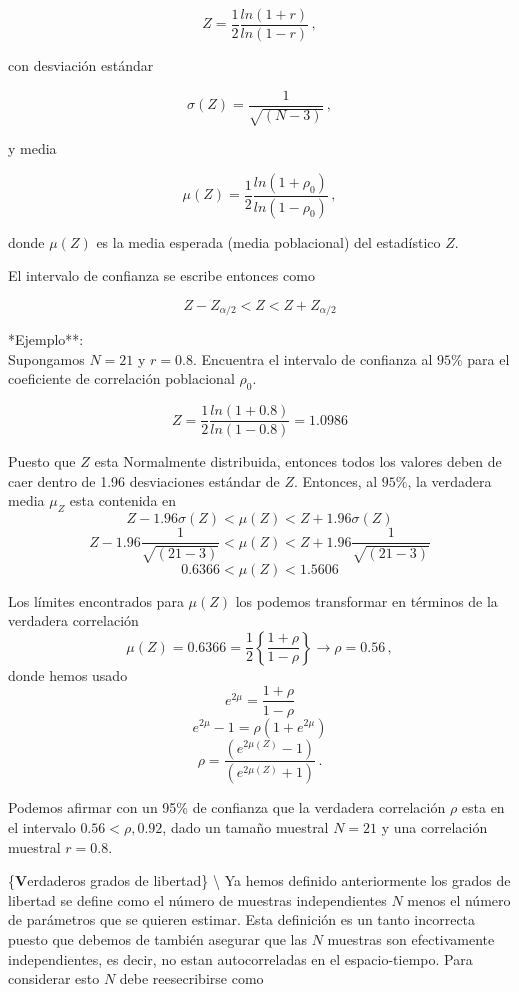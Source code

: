 \documentclass[
]{agujournal2019}
\begin{document}
\[Z=\frac{1}{2}\frac{ln(1+r)}{ln(1-r)}\,,\]

con desviación estándar

\[\sigma(Z)=\frac{1}{\sqrt{(N-3)}}\,,\]

y media

\[\mu(Z)=\frac{1}{2}\frac{ln(1+\rho_0)}{ln(1-\rho_0)}\,,\]

donde \(\mu(Z)\) es la media esperada (media poblacional) del
estadístico \(Z\).

El intervalo de confianza se escribe entonces como

\[Z-Z_{\alpha/2}<Z<Z+Z_{\alpha/2}\]

\vspace{0.5cm}

\noindent **Ejemplo**:\\
\noindent Supongamos \(N=21\) y \(r=0.8\). Encuentra el intervalo de
confianza al \(95\%\) para el coeficiente de correlación poblacional
\(\rho_0\).

\[Z=\frac{1}{2}\frac{ln(1+0.8)}{ln(1-0.8)}=1.0986\]

\noindent Puesto que \(Z\) esta Normalmente distribuida, entonces todos
los valores deben de caer dentro de 1.96 desviaciones estándar de \(Z\).
Entonces, al \(95\%\), la verdadera media \(\mu_Z\) esta contenida en
\[Z-1.96\sigma(Z) < \mu(Z) < Z + 1.96\sigma(Z)\]
\[Z-1.96\frac{1}{\sqrt{(21-3)}} < \mu(Z) < Z + 1.96\frac{1}{\sqrt{(21-3)}}\]
\[0.6366<\mu(Z)<1.5606\]

\noindent Los límites encontrados para \(\mu(Z)\) los podemos
transformar en términos de la verdadera correlación
\[\mu(Z)=0.6366=\frac{1}{2} \left\{ \frac{1+\rho}{1-\rho} \right\} \rightarrow  \rho=0.56\,,\]
donde hemos usado \[e^{2\mu}=\frac{1+\rho}{1-\rho}\]
\[e^{2\mu}-1=\rho(1+e^{2\mu})\]
\[\rho=\frac{(e^{2\mu(Z)}-1)}{(e^{2\mu(Z)}+1)}\,.\]

\noindent Podemos afirmar con un 95\% de confianza que la verdadera
correlación \(\rho\) esta en el intervalo \(0.56<\rho,0.92\), dado un
tamaño muestral \(N=21\) y una correlación muestral \(r=0.8\).

\vspace{0.5cm}

\{\noindent \textbf Verdaderos grados de libertad\} \textbackslash{}
\noindent Ya hemos definido anteriormente los grados de libertad se
define como el número de muestras independientes \(N\) menos el número
de parámetros que se quieren estimar. Esta definición es un tanto
incorrecta puesto que debemos de también asegurar que las \(N\) muestras
son efectivamente independientes, es decir, no estan autocorreladas en
el espacio-tiempo. Para considerar esto \(N\) debe reesecribirse como
\end{document}
